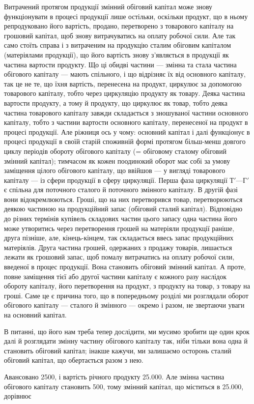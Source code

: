 Витрачений протягом продукції змінний обіговий капітал може знову
функціонувати в процесі продукції лише остільки, оскільки продукт, що
в ньому репродуковано його вартість, продано, перетворено з товарового
капіталу на грошовий капітал, щоб знову витрачуватись на оплату робочої
сили. Але так само стоїть справа і з витраченим на продукцію сталим
обіговим капіталом (матеріялами продукції), що його вартість знову з’являється
в продукції як частина вартости продукту. Що ці обидві частини —
змінна та стала частина обігового капіталу — мають спільного, і що відрізняє
їх від основного капіталу, так це не те, що їхня вартість, перенесена
на продукт, циркулює за допомогою товарового капіталу, тобто
через циркуляцію продукту як товару. Деяка частина вартости продукту,
а тому й продукту, що циркулює як товар, тобто деяка частина товарового
капіталу завжди складається з зношуваної частини основного капіталу,
тобто з частини вартости основного капіталу, перенесеної на продукт
в процесі продукції. Але ріжниця ось у чому: основний капітал і
далі функціонує в процесі продукції в своїй старій споживній формі протягом
більш-менш довгого циклу періодів обороту обігового капіталу
(= обіговому сталому \dplus{} обіговий змінний капітал); тимчасом як кожен
поодинокий оборот має собі за умову заміщення цілого обігового капіталу,
що ввійшов — у вигляді товарового капіталу — із сфери продукції в
сферу циркуляції. Перша фаза циркуляції $Т' — Г'$ є спільна для поточного
сталого й поточного змінного капіталу. В другій фазі вони відокремлюються.
Гроші, що на них перетворився товар, перетворюються деякою
частиною на продукційний запас (обіговий сталий капітал). Відповідно до
різних термінів купівель складових частин цього запасу одна частина
його може утворитись через перетворення грошей на матеріяли продукції
раніше, друга пізніше, але, кінець-кінцем, так складається ввесь запас продукційних
матеріялів. Друга частина грошей, одержаних з продажу товарів,
лишається лежати як грошовий запас, щоб помалу витрачатись на
оплату робочої сили, введеної в процес продукції. Вона становить обіговий
змінний капітал. А проте, повне заміщення тієї або другої частини капіталу
є кожного разу наслідок обороту капіталу, його перетворення на продукт,
з продукту на товар, з товару на гроші. Саме це є причина того,
що в попередньому розділі ми розглядали оборот обігового капіталу — сталого
й змінного — окремо і разом, не звертаючи уваги на основний капітал.

В питанні, що його нам треба тепер дослідити, ми мусимо зробити ще
один крок далі й розглядати змінну частину обігового капіталу так, ніби
тільки вона одна й становить обіговий капітал; інакше кажучи, ми залишаємо
осторонь сталий обіговий капітал, що обертається разом з нею.

Авансовано 2500, і вартість річного продукту \deq{} \num{25.000}. Але змінна частина обігового капіталу становить 500,
тому змінний капітал, що міститься в \num{25.000}, дорівнює
\parbreak{}  %
